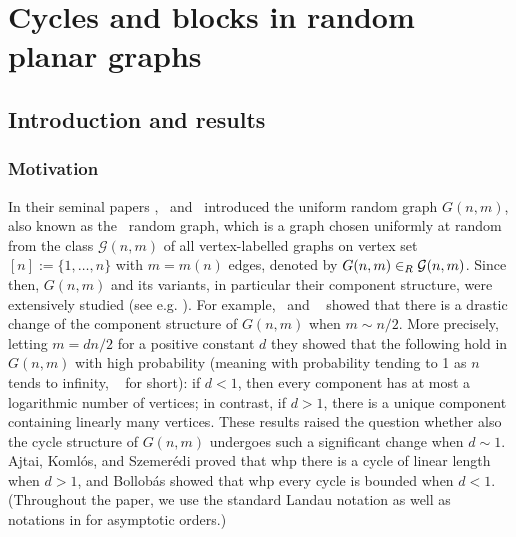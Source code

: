 
\chapter{Cycles and blocks in random planar graphs}\label{cha:cycles_blocks}

\section{Introduction and results}\label{CBsec:intro}

\subsection{Motivation}\label{CBsec:background}
In their seminal papers \cite{ErdoesRenyi1959, ErdoesRenyi1960}, \Erdos\ and \Renyi\ introduced the uniform random graph $G(n,m)$, also known as the \ER\ random graph, which is a graph chosen uniformly at random from the class $\mathcal{G}(n,m)$ of all vertex-labelled graphs on vertex set $[n]:=\{1, \ldots, n\}$ with $m=m(n)$ edges, denoted by $G(n,m) \in_R \mathcal G(n,m)$. Since then, $G(n,m)$ and its variants, in particular their component structure, were extensively studied (see e.g. \cite{Bollobas2001, FriezeKaronski2016, JansonLuczakRucinski2000,Bollobas1984, ErdoesRenyi1960, Luczak1990}). For example, \Erdos\ and \Renyi\ \cite{ErdoesRenyi1960} showed that there is a drastic change of the component structure of $G(n,m)$ when $m\sim n/2$. More precisely, letting $m=dn/2$ for a positive constant $d$ they showed that the following hold in $G(n,m)$ with high probability (meaning with probability tending to 1 as $n$ tends to infinity, {\em \whp\ } for short): if $d<1$, then every component has at most a logarithmic number of vertices; in contrast, if $d>1$, there is a unique component containing linearly many vertices. These results raised the question whether also the cycle structure of $G(n,m)$ undergoes such a significant change when $d\sim 1$. Ajtai, {Koml\'os}, and {Szemer\'edi} \cite{AjtaiKomlosSzemeredi1981} proved that whp there is a cycle of linear length when $d>1$, and {Bollob\'as} \cite[Corollary 5.8]{Bollobas2001} showed that whp every cycle is bounded when $d<1$. (Throughout the paper, we use the standard Landau notation as well as notations in  for asymptotic orders.)

